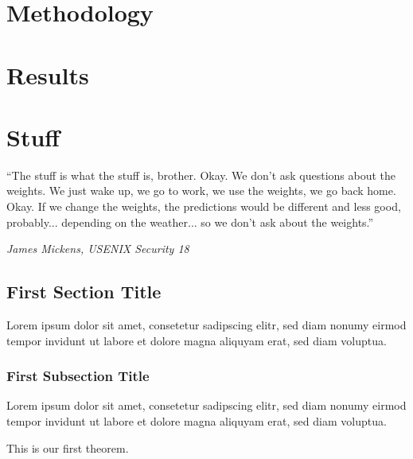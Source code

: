 \documentclass[a4paper, oneside]{discothesis}
\begin{document}

\chapter{Methodology}

\chapter{Results}

\chapter{Stuff}


\newpage

\begin{flushright}
	``The stuff is what the stuff is, brother. Okay. We don't ask questions about the weights. We just wake up, we go to work, we use the weights, we go back home. Okay. If we change the weights, the predictions would be different and less good, probably... depending on the weather... so we don't ask about the weights.''
	
	\textit{\textemdash{} James Mickens, USENIX Security 18~\cite{218395}}
\end{flushright}

\bigskip

\section{First Section Title}

Lorem ipsum dolor sit amet, consetetur sadipscing elitr, sed diam nonumy eirmod tempor invidunt ut labore et dolore magna aliquyam erat, sed diam voluptua.

\subsection{First Subsection Title}

Lorem ipsum dolor sit amet, consetetur sadipscing elitr, sed diam nonumy eirmod tempor invidunt ut labore et dolore magna aliquyam erat, sed diam voluptua.

\begin{theorem} \label{thm:first theorem}
	This is our first theorem.
\end{theorem}
\end{document}
